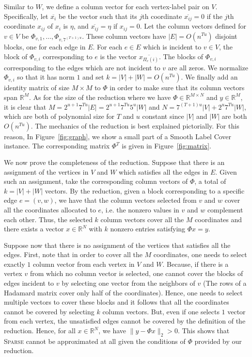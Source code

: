 \documentclass[11pt]{article}
\begin{document}
Similar to $W$, we define a column vector for each
vertex-label pair on $V$. Specifically, let $\overline{x_i}$
be the vector such that its $j$th coordinate
$\overline{x_{ij}} = 0$ if the $j$th coordinate $x_{ij}$
of $x_i$ is $\eta$, and $\overline{x_{ij}} = \eta$ if
$x_{ij} = 0$. Let the column vectors defined for
$v \in V$ be $\Phi_{v,1}, \hdots, \Phi_{v,7^{(T+1)u}}$.
These column vectors have $|E| = O(n^{Tu})$ disjoint blocks,
one for each edge in $E$. For each $e \in E$ which is
incident to $v \in V$, the block of $\Phi_{v,i}$ corresponding
to $e$ is the vector $\overline{x_{\Pi_e(i)}}$. The blocks
of $\Phi_{v,i}$ corresponding to the edges which are not
incident to $v$ are all zeros. We normalize
$\Phi_{v,i}$ so that it has norm $1$ and set $k=|V|+|W| = O(n^{Tu})$.
We finally add an identity matrix of size $M \times M$ to $\Phi$
in order to make sure that its column vectors span $\mathbb{R}^M$.
As for the size of the reduction where we have
$\Phi \in \mathbb{R}^{M \times N}$ and $y \in \mathbb{R}^M$,
it is clear that $M = 2^{u+1}7^{Tu}|E| = 2^{u+1}7^{Tu}5^u|W|$ and
$N = 7^{(T+1)u}|V|+2^u7^{Tu}|W|$, which are
both of polynomial size for $T$ and $u$ constant since
$|V|$ and $|W|$ are both $O(n^{Tu})$. The mechanics of the
reduction is best explained pictorially. For this reason,
In Figure~\ref{fig:graph}, we show a small part of a Smooth
Label Cover instance. The corresponding matrix $\Phi^T$ is
given in Figure~\ref{fig:matrix}.

We now prove the completeness
of the reduction. Suppose that there is an assignment of the
vertices in $V$ and $W$ which satisfies all the edges in $E$.
Given such an assignment, take the corresponding column vectors
of $\Phi$, a total of $k=|V|+|W|$ vectors. By the reduction,
given a block corresponding to a specific edge $e = (v,w)$, we
have that the column vectors selected from $v$ and $w$ cover
all the coordinates allocated to $e$, i.e. the nonzero values
in $v$ and $w$ complement each other. Thus, the selected $k$
column vectors cover all the $M$ coordinates and there
exists a vector $x \in \mathbb{R}^N$ with $k$ nonzero entries
satisfying $\Phi x = y$.

Suppose now that there is no assignment of the vertices that
satisfies all the edges. First, note that in order to cover
all the $M$ coordinates, one needs to select exactly $1$
column vector from each vertex in $V$ and $W$. Because, if
there is a vertex $v$ from which no column vector is selected,
one cannot cover the blocks of edges incident to $v$ by
selecting one vector from the neighbors of $v$ (The rows of
a Hadamard matrix cover only half of the coordinates). Hence,
one needs to select multiple vectors to cover these blocks
and it follows that all the coordinates cannot be covered by
selecting $k$ column vectors. But, even if one selects $1$
vector from each vertex, the unsatisfied edges cannot be
covered by the definition of the reduction. Hence, for all
$x \in \mathbb{R}^N$, we have $\|y - \Phi x\|_2 > 0$. This
shows that \textsc{Sparse} cannot be approximated at all given
the conditions of $\Phi$ provided by our reduction.
\end{document}
